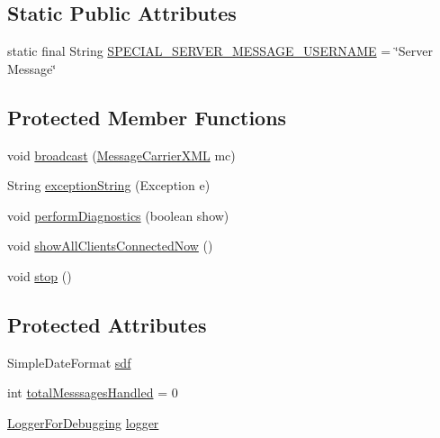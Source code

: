 \subsection*{Static Public Attributes}
\begin{DoxyCompactItemize}
\item 
static final String \hyperlink{classgov_1_1fnal_1_1ppd_1_1dd_1_1chat_1_1MessagingServer_a738da0a18944421491268d2220a3c7a4}{S\-P\-E\-C\-I\-A\-L\-\_\-\-S\-E\-R\-V\-E\-R\-\_\-\-M\-E\-S\-S\-A\-G\-E\-\_\-\-U\-S\-E\-R\-N\-A\-M\-E} = \char`\"{}Server Message\char`\"{}
\end{DoxyCompactItemize}
\subsection*{Protected Member Functions}
\begin{DoxyCompactItemize}
\item 
void \hyperlink{classgov_1_1fnal_1_1ppd_1_1dd_1_1chat_1_1MessagingServer_ad4cb5effceeb2b11031e3cf2ec0e5939}{broadcast} (\hyperlink{classgov_1_1fnal_1_1ppd_1_1dd_1_1xml_1_1MessageCarrierXML}{Message\-Carrier\-X\-M\-L} mc)
\item 
String \hyperlink{classgov_1_1fnal_1_1ppd_1_1dd_1_1chat_1_1MessagingServer_afe655a915ee116333ee6f1c8331b7929}{exception\-String} (Exception e)
\item 
void \hyperlink{classgov_1_1fnal_1_1ppd_1_1dd_1_1chat_1_1MessagingServer_af24f72f6ce9d270c33afb4032d9c968b}{perform\-Diagnostics} (boolean show)
\item 
void \hyperlink{classgov_1_1fnal_1_1ppd_1_1dd_1_1chat_1_1MessagingServer_a90da887bb782b08af3fb1dbce8c3e502}{show\-All\-Clients\-Connected\-Now} ()
\item 
void \hyperlink{classgov_1_1fnal_1_1ppd_1_1dd_1_1chat_1_1MessagingServer_a2ab9736895b528ec810dd27eb5761295}{stop} ()
\end{DoxyCompactItemize}
\subsection*{Protected Attributes}
\begin{DoxyCompactItemize}
\item 
Simple\-Date\-Format \hyperlink{classgov_1_1fnal_1_1ppd_1_1dd_1_1chat_1_1MessagingServer_ac727c375b30722fb0d0a88f27eb97954}{sdf}
\item 
int \hyperlink{classgov_1_1fnal_1_1ppd_1_1dd_1_1chat_1_1MessagingServer_a6847562b2441991b550f7b3cb7fe8f2d}{total\-Messsages\-Handled} = 0
\item 
\hyperlink{classgov_1_1fnal_1_1ppd_1_1dd_1_1chat_1_1LoggerForDebugging}{Logger\-For\-Debugging} \hyperlink{classgov_1_1fnal_1_1ppd_1_1dd_1_1chat_1_1MessagingServer_acc91232824dd5e89347e0d8ac29abae8}{logger}
\end{DoxyCompactItemize}



